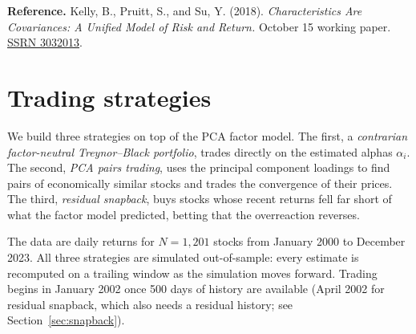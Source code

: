 \documentclass[12pt,letterpaper]{article}
\begin{document}
\begin{enumerate}
\end{enumerate}

\begingroup\small
\noindent\textbf{Reference.}
Kelly, B., Pruitt, S., and Su, Y. (2018).
\emph{Characteristics Are Covariances: A Unified Model of Risk and Return.}
October 15 working paper. \href{https://ssrn.com/abstract=3032013}{SSRN 3032013}.
\par\endgroup




\section{Trading strategies}
\label{sec:strategies}

We build three strategies on top of the PCA factor model. The first, a \emph{contrarian factor-neutral Treynor--Black portfolio}, trades directly on the estimated alphas $\alpha_i$. The second, \emph{PCA pairs trading}, uses the principal component loadings to find pairs of economically similar stocks and trades the convergence of their prices. The third, \emph{residual snapback}, buys stocks whose recent returns fell far short of what the factor model predicted, betting that the overreaction reverses.

The data are daily returns for $N = 1{,}201$ stocks from January 2000 to December 2023. All three strategies are simulated out-of-sample: every estimate is recomputed on a trailing window as the simulation moves forward. Trading begins in January 2002 once 500 days of history are available (April 2002 for residual snapback, which also needs a residual history; see Section~\ref{sec:snapback}).
\end{document}
